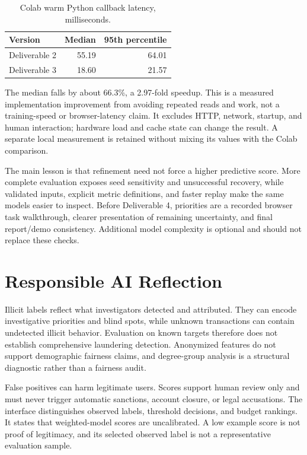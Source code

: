 \documentclass[10pt,twocolumn,letterpaper]{article}
\begin{document}
\begin{table}[t]\caption{Colab warm Python callback latency, milliseconds.}\centering\small
\begin{tabular}{lrr}\toprule
Version & Median & 95th percentile\\\midrule
Deliverable 2 & 55.19 & 64.01\\
Deliverable 3 & 18.60 & 21.57\\\bottomrule
\end{tabular}\label{tab:latency}\end{table}

The median falls by about 66.3\%, a 2.97-fold speedup. This is a measured implementation improvement from avoiding repeated reads and work, not a training-speed or browser-latency claim. It excludes HTTP, network, startup, and human interaction; hardware load and cache state can change the result. A separate local measurement is retained without mixing its values with the Colab comparison.

The main lesson is that refinement need not force a higher predictive score. More complete evaluation exposes seed sensitivity and unsuccessful recovery, while validated inputs, explicit metric definitions, and faster replay make the same models easier to inspect. Before Deliverable 4, priorities are a recorded browser task walkthrough, clearer presentation of remaining uncertainty, and final report/demo consistency. Additional model complexity is optional and should not replace these checks.

\section{Responsible AI Reflection}
Illicit labels reflect what investigators detected and attributed. They can encode investigative priorities and blind spots, while unknown transactions can contain undetected illicit behavior. Evaluation on known targets therefore does not establish comprehensive laundering detection. Anonymized features do not support demographic fairness claims, and degree-group analysis is a structural diagnostic rather than a fairness audit.

False positives can harm legitimate users. Scores support human review only and must never trigger automatic sanctions, account closure, or legal accusations. The interface distinguishes observed labels, threshold decisions, and budget rankings. It states that weighted-model scores are uncalibrated. A low example score is not proof of legitimacy, and its selected observed label is not a representative evaluation sample.
\end{document}
